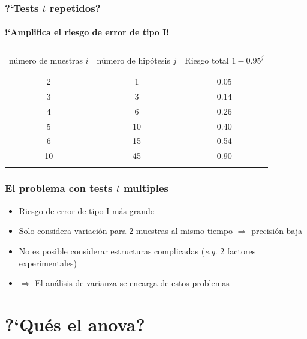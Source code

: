 \documentclass[gray,handout,mathserif]{beamer}
\begin{document}
\begin{frame}[label=anov4]
   \frametitle{?`Tests $t$ repetidos?}
   \framesubtitle{!`Amplifica el riesgo de error de tipo I!}

   \footnotesize

   \begin{table}
      \begin{tabular}{ccc}
         \firsthline
         \\[-0.85cm]
         \parbox[t]{13ex}{\flushleft n\'umero de muestras $i$} & \parbox[t]{13ex}{\flushleft n\'umero de hip\'otesis $j$} & \parbox[t]{13ex}{\flushleft Riesgo total $1-0.95^j$} \\
         \\[-1ex]
         \hline \\[-1ex]
         2 & 1 & 0.05 \\
         3 & 3 & 0.14 \\
         4 & 6 & 0.26 \\
         \alert{5} & \alert{10} & \alert{0.40} \\
         6 & 15 & 0.54 \\
         10 & 45 & 0.90 \\
         \lasthline
      \end{tabular}
   \end{table}
\end{frame}%


\begin{frame}[label=anov5]
   \frametitle{El problema con tests $t$ multiples}
    \begin{itemize}
      \item Riesgo de error de tipo I m\'as grande
      \item Solo considera variaci\'on para 2 muestras al mismo tiempo $\Rightarrow$ precisi\'on baja
      \item No es posible considerar estructuras complicadas (\emph{e.g.} 2 factores experimentales)
      \medskip
      \item[ ] $\Rightarrow$ El an\'alisis de varianza se encarga de estos problemas
   \end{itemize}
\end{frame}%



\section[Definici\'on]{?`Qu\' es el anova?}
\end{document}
